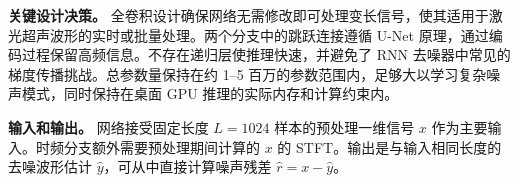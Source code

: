 \textbf{关键设计决策。} 全卷积设计确保网络无需修改即可处理变长信号，使其适用于激光超声波形的实时或批量处理。两个分支中的跳跃连接遵循 U-Net 原理，通过编码过程保留高频信息。不存在递归层使推理快速，并避免了 RNN 去噪器中常见的梯度传播挑战。总参数量保持在约 1--5 百万的参数范围内，足够大以学习复杂噪声模式，同时保持在桌面 GPU 推理的实际内存和计算约束内。

\textbf{输入和输出。} 网络接受固定长度 $L = 1024$ 样本的预处理一维信号 $x$ 作为主要输入。时频分支额外需要预处理期间计算的 $x$ 的 STFT。输出是与输入相同长度的去噪波形估计 $\hat{y}$，可从中直接计算噪声残差 $\hat{r} = x - \hat{y}$。